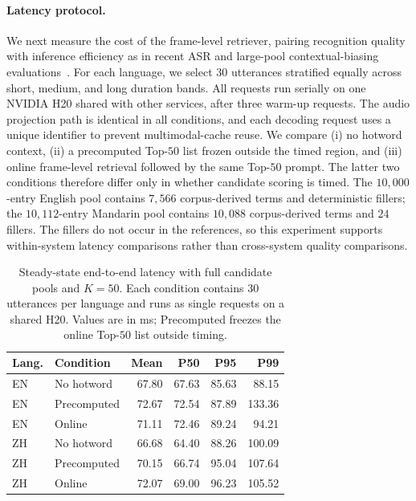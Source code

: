 \paragraph{Latency protocol.}
We next measure the cost of the frame-level retriever, pairing
recognition quality with inference efficiency as in recent ASR and
large-pool contextual-biasing evaluations~\cite{srivastav2025open,gong2025br}.
For each language, we select $30$ utterances stratified equally across
short, medium, and long duration bands. All requests run serially on
one NVIDIA H20 shared with other services, after three warm-up
requests. The audio projection path is identical in all conditions,
and each decoding request uses a unique identifier to prevent
multimodal-cache reuse. We compare (i) no hotword context,
(ii) a precomputed Top-$50$ list frozen outside the timed region, and
(iii) online frame-level retrieval followed by the same Top-$50$
prompt. The latter two conditions therefore differ only in whether
candidate scoring is timed. The $10{,}000$-entry English pool contains
$7{,}566$ corpus-derived terms and deterministic fillers; the
$10{,}112$-entry Mandarin pool contains $10{,}088$ corpus-derived terms
and $24$ fillers. The fillers do not occur in the references, so this
experiment supports within-system latency comparisons rather than
cross-system quality comparisons.

\begin{table}[t]
  \caption{Steady-state end-to-end latency with full candidate pools
    and $K{=}50$. Each condition contains $30$ utterances per language
    and runs as single requests on a shared H20. Values are in ms;
    Precomputed freezes the online Top-$50$ list outside timing.}
  \label{tab:hotword_latency}
  \centering
  \small
  \setlength{\tabcolsep}{3.5pt}
  \begin{tabular}{llrrrr}
    \toprule
    Lang. & Condition & Mean & P50 & P95 & P99 \\
    \midrule
    EN & No hotword  & 67.80 & 67.63 & 85.63 & 88.15 \\
    EN & Precomputed & 72.67 & 72.54 & 87.89 & 133.36 \\
    EN & Online      & 71.11 & 72.46 & 89.24 & 94.21 \\
    \midrule
    ZH & No hotword  & 66.68 & 64.40 & 88.26 & 100.09 \\
    ZH & Precomputed & 70.15 & 66.74 & 95.04 & 107.64 \\
    ZH & Online      & 72.07 & 69.00 & 96.23 & 105.52 \\
    \bottomrule
  \end{tabular}
\end{table}

